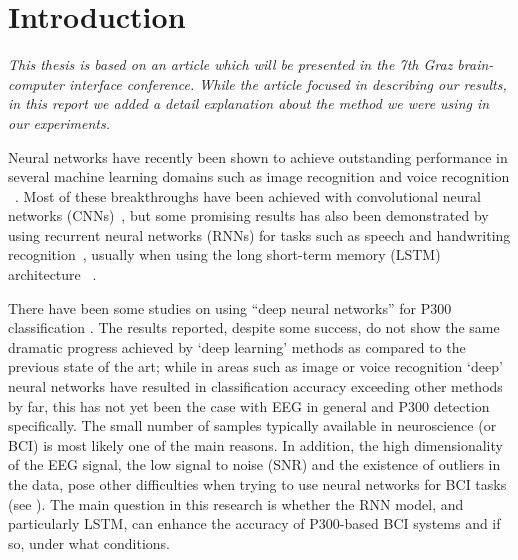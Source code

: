 \documentclass[
12pt, %
english, %
doublespacing, %
headsepline, %
]{MastersDoctoralThesis} %
\begin{document}
\pagestyle{thesis} %



\chapter{Introduction}

\vspace{0.4cm}


\textit{This thesis is based on an article which will be presented in the 7th Graz brain-computer interface conference. While the article focused in describing our results, in this report we added a detail explanation about the method we were using in our experiments.}

Neural networks have recently been shown to achieve outstanding performance in several machine learning domains such as image recognition \cite{krizhevsky2012imagenet} and voice recognition ~\cite{hinton2012deep}. Most of these breakthroughs have been achieved with convolutional neural networks (CNNs)~\cite{Lenet98}, but some promising results has also been demonstrated by using recurrent neural networks (RNNs) for tasks such as speech and handwriting recognition~\cite{graves2013speech, graves2008unconstrained}, usually when using the long short-term memory (LSTM) architecture ~\cite{LSTM_origin}.

There have been some studies on using ``deep neural networks'' for P300 classification \cite{P300_CNN, RSVP_P300_geva}. The results reported, despite some success, do not show the same dramatic progress achieved by `deep learning' methods as compared to the previous state of the art; while in areas such as image or voice recognition `deep' neural networks have resulted in classification accuracy exceeding other methods by far, this has not yet been the case with EEG in general and P300 detection specifically. The small number of samples typically available in neuroscience (or BCI) is most likely one of the main reasons. In addition, the high dimensionality of the EEG signal, the low signal to noise (SNR) and the existence of outliers in the data, pose other difficulties when trying to use neural networks for BCI tasks (see \cite{lotte2007review}). The main question in this research is whether the RNN model, and particularly LSTM, can enhance the accuracy of P300-based BCI systems and if so, under what conditions.
\end{document}
